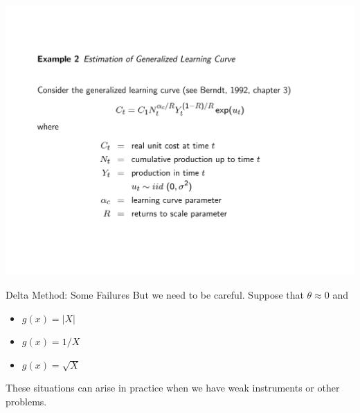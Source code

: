 \begin{frame}[plain]{}
	\includegraphics[page=6,trim={2cm 2cm 2cm 2cm},clip,width=\textwidth]{./resources/zivotLearning.pdf}
\end{frame}

\begin{frame}{Delta Method: Some Failures}
  But we need to be careful.  Suppose that $\theta \approx 0$ and 
  \begin{itemize}
  \item $g(x)  = |X|$
  \item $g(x)  = 1/X$
  \item $g(x)  = \sqrt{X}$
  \end{itemize}
  These situations can arise in practice when we have weak instruments or other problems.\end{frame}
  
